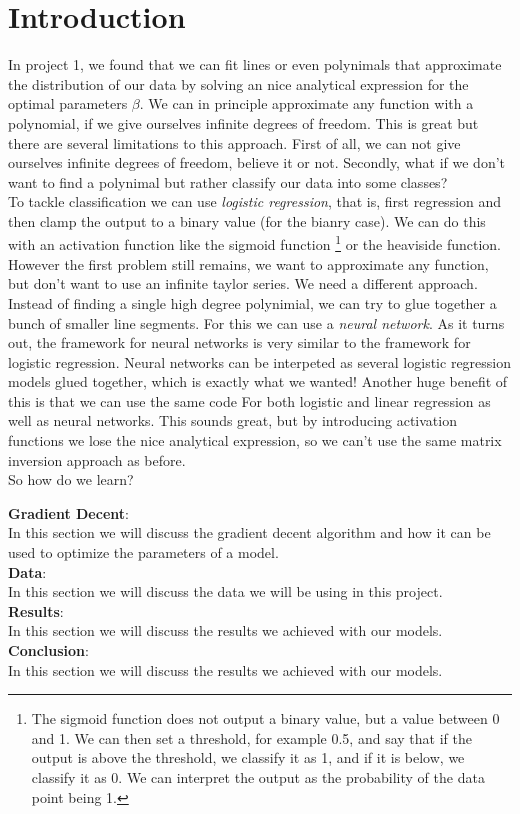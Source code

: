 \documentclass[twoside,11pt]{report}
\begin{document}
\section*{Introduction}



In project 1\cite{MachineLearningProjects_2023}, we found that 
we can fit lines or even polynimals that approximate the distribution of our data by solving an nice analytical expression for the optimal parameters $\beta$. We can in principle approximate 
any function with a polynomial, if we give ourselves infinite degrees of freedom. This is great but there are several
limitations to this approach. First of all, we can not give ourselves infinite degrees of freedom, believe it or not.
Secondly, what if we don't want to find a polynimal but rather classify our data into some classes?\\

\noindent
To tackle classification we can use \emph{logistic regression}, that is, first regression and then clamp the output to a binary value
(for the bianry case). We can do this with an activation function like the sigmoid function
\footnote{The sigmoid function does not output a binary value, but a value between 0 and 1. 
    We can then set a threshold, for example 0.5, and say that if the output is above the threshold, 
    we classify it as 1, and if it is below, we classify it as 0. We can interpret the output as the 
probability of the data point being 1.}
or the heaviside function. However the first problem
still remains, we want to approximate any function, but don't want to use an infinite taylor series. 
We need a different approach.
Instead of finding a single high degree polynimial, we can try to glue together a bunch of smaller line segments.
For this we can use a \emph{neural network}.
As it turns out, the framework for neural networks is very similar to the framework for logistic regression.
Neural networks can be interpeted as several logistic regression models glued together, which is exactly what we wanted!
Another huge benefit of this is that we can use the same code
For both logistic and linear regression as well as neural networks.
This sounds great, but by introducing activation functions we lose the nice analytical expression,
so we can't use the same matrix inversion approach as before.\\
So how do we learn?


\noindent
\textbf{Gradient Decent}:\\ 
In this section we will discuss the gradient decent algorithm and how it can be used to
optimize the parameters of a model.\\
\textbf{Data}: \\
In this section we will discuss the data we will be using in this project.\\
\textbf{Results}:\\
In this section we will discuss the results we achieved with our models.\\
\textbf{Conclusion}:\\
In this section we will discuss the results we achieved with our models.\\
\end{document}

